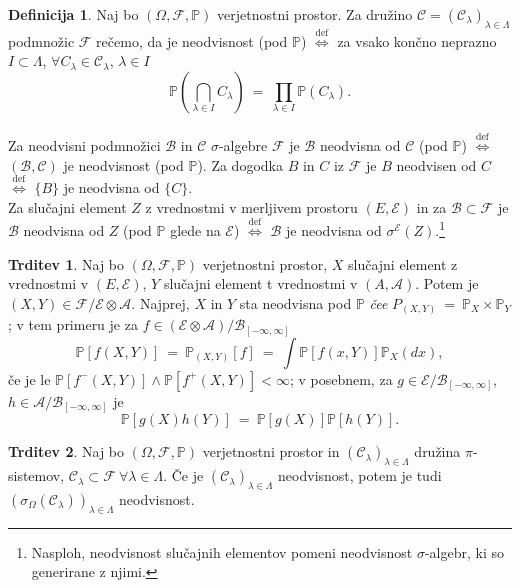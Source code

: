 \documentclass[11pt]{article}
\renewcommand{\P}{\mathbb{P}}
\newcommand{\A}{\mathcal{A}}
\newcommand{\BB}{\mathcal{B}}
\newcommand{\CC}{\mathcal{C}}
\newcommand{\F}{\mathcal{F}}
\newcommand{\B}{\mathscr{B}}
\newcommand{\C}{\mathcal{C}}
\newcommand{\EE}{\mathcal{E}}
\newcommand{\diff}{\overset{\text{def}}{\iff}}
\newcommand{\set}[1]{\{#1\}}
\newcommand{\oklepaj}[1]{\left(#1\right)}
\newcommand{\1}{\mathbbm{1}}
\newcommand{\rr}{[-\infty,\infty]}
\theoremstyle{definition}
\newtheorem{definicija}{Definicija}[section]
\theoremstyle{definition}
\newtheorem{trditev}{Trditev}[section]
\theoremstyle{definition}
\theoremstyle{definition}
\begin{document}
\begin{definicija}

Naj bo $(\Omega, \F, \P)$ verjetnostni prostor. Za družino $\C=(\C_\lambda)_{\lambda\in\Lambda}$ podmnožic $\F$ rečemo, da je neodvisnost (pod $\P$) $\diff$ za vsako končno neprazno $I \subset \Lambda$, $\forall C_\lambda \in \C_\lambda$, $\lambda \in I$
$$\P\oklepaj{\bigcap_{\lambda \in I} C_\lambda} ~=~ \prod_{\lambda \in I} \P(C_\lambda).$$\\

Za neodvisni podmnožici $\BB$ in $\CC$ $\sigma$-algebre $\F$ je $\BB$ neodvisna od $\CC$ (pod $\P$) $\diff$ $(\BB,\CC)$ je neodvisnost (pod $\P$). Za dogodka $B$ in $C$ iz $\F$ je $B$ neodvisen od $C$ $\diff$ $\set{B}$ je neodvisna od $\set{C}$. \\

Za slučajni element $Z$ z vrednostmi v merljivem prostoru $(E,\EE)$ in za $\BB \subset \F$ je $\BB$ neodvisna od $Z$ (pod $\P$ glede na $\EE$) $\diff$ $\BB$ je neodvisna od $\sigma^\EE(Z)$.\footnote{Nasploh, neodvisnost slučajnih elementov pomeni neodvisnost $\sigma$-algebr, ki so generirane z njimi.}

\end{definicija}
\vspace{0.5cm}

\begin{trditev}

Naj bo $(\Omega, \F, \P)$ verjetnostni prostor, $X$ slučajni element z vrednostmi v $(E, \EE)$, $Y$ slučajni element t vrednostmi v $(A, \A)$. Potem je $(X,Y) \in \F/\EE\otimes\A$. Najprej, $X$ in $Y$ sta neodvisna pod $\P$ \textit{čee} \hbox{$P_{(X,Y)} ~=~ \P_X \times \P_Y$};
v tem primeru je za $f \in (\EE \otimes \A)/\B_{\rr}$
$$\P[f(X,Y)] ~=~ \P_{(X,Y)}[f] ~=~ \int \P[f(x,Y)]\P_X(dx),$$
če je le $\P[f^-(X,Y)] \wedge \P[f^+(X,Y)] < \infty$; v posebnem, za $g \in \EE/\B_{\rr}$, $h \in \A/\B_{\rr}$ je
$$\P[g(X)h(Y)] ~=~ \P[g(X)]\P[h(Y)].$$

\end{trditev}
\vspace{0.5cm}

\begin{trditev}

Naj bo $(\Omega, \F, \P)$ verjetnostni prostor in $(\C_\lambda)_{\lambda \in \Lambda}$ družina $\pi$-sistemov, $\C_\lambda \subset \F ~\forall \lambda \in \Lambda$. Če je $(\C_\lambda)_{\lambda \in \Lambda}$ neodvisnost, potem je tudi $(\sigma_\Omega(\C_\lambda))_{\lambda\in\Lambda}$ neodvisnost.

\end{trditev}
\vspace{0.5cm}
\end{document}
